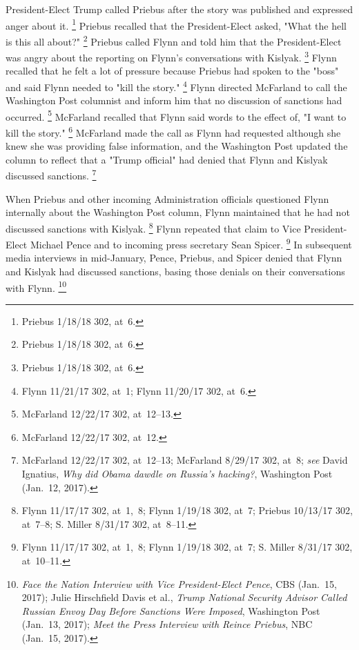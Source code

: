 President-Elect Trump called Priebus after the story was published and expressed anger about it.%
\footnote{Priebus 1/18/18 302, at~6.}
Priebus recalled that the President-Elect asked, "What the hell is this all about?"%
\footnote{Priebus 1/18/18 302, at~6.}
Priebus called Flynn and told him that the President-Elect was angry about the reporting on Flynn's conversations with Kislyak.%
\footnote{Priebus 1/18/18 302, at~6.}
Flynn recalled that he felt a lot of pressure because Priebus had spoken to the "boss" and said Flynn needed to "kill the story."%
\footnote{Flynn 11/21/17 302, at~1;
Flynn 11/20/17 302, at~6.}
Flynn directed McFarland to call the Washington Post columnist and inform him that no discussion of sanctions had occurred.%
\footnote{McFarland 12/22/17 302, at~12--13.}
McFarland recalled that Flynn said words to the effect of, "I want to kill the story."%
\footnote{McFarland 12/22/17 302, at~12.}
McFarland made the call as Flynn had requested although she knew she was providing false information, and the Washington Post updated the column to reflect that a "Trump official" had denied that Flynn and Kislyak discussed sanctions.%
\footnote{McFarland 12/22/17 302, at~12--13;
McFarland 8/29/17 302, at~8;
\textit{see} David Ignatius, \textit{Why did Obama dawdle on Russia's hacking?}, Washington Post (Jan.~12, 2017).}

When Priebus and other incoming Administration officials questioned Flynn internally about the Washington Post column, Flynn maintained that he had not discussed sanctions with Kislyak.%
\footnote{Flynn 11/17/17 302, at~1,~8;
Flynn 1/19/18 302, at~7;
Priebus 10/13/17 302, at~7--8;
S. Miller 8/31/17 302, at~8--11.}
Flynn repeated that claim to Vice President-Elect Michael Pence and to incoming press secretary Sean Spicer.%
\footnote{Flynn 11/17/17 302, at~1,~8;
Flynn 1/19/18 302, at~7;
S. Miller 8/31/17 302, at~10--11.}
In subsequent media interviews in mid-January, Pence, Priebus, and Spicer denied that Flynn and Kislyak had discussed sanctions, basing those denials on their conversations with Flynn.%
\footnote{\textit{Face the Nation Interview with Vice President-Elect Pence}, CBS (Jan.~15, 2017);
Julie Hirschfield Davis et al., \textit{Trump National Security Advisor Called Russian Envoy Day Before Sanctions Were Imposed}, Washington Post (Jan.~13, 2017);
\textit{Meet the Press Interview with Reince Priebus}, NBC (Jan.~15, 2017).}

